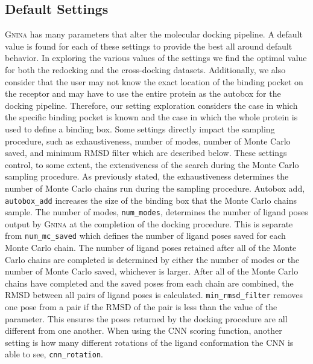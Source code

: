 \documentclass[journal=jcisd8,manuscript=article]{achemso}
\begin{document}
\subsection{Default Settings}
\textsc{Gnina} has many parameters that alter the molecular docking pipeline. A default value is found for each of these settings to provide the best all around default behavior. In exploring the various values of the settings we find the optimal value for both the redocking and the cross-docking datasets. Additionally, we also consider that the user may not know the exact location of the binding pocket on the receptor and may have to use the entire protein as the autobox for the docking pipeline. Therefore, our setting exploration considers the case in which the specific binding pocket is known and the case in which the whole protein is used to define a binding box. Some settings directly impact the sampling procedure, such as exhaustiveness, number of modes, number of Monte Carlo saved, and minimum RMSD filter which are described below. These settings control, to some extent, the extensiveness of the search during the Monte Carlo sampling procedure. As previously stated, the exhaustiveness determines the number of Monte Carlo chains run during the sampling procedure. Autobox add, \texttt{autobox\_add} increases the size of the binding box that the Monte Carlo chains sample. The number of modes, \texttt{num\_modes}, determines the number of ligand poses output by \textsc{Gnina} at the completion of the docking procedure. This is separate from \texttt{num\_mc\_saved} which defines the number of ligand poses saved for each Monte Carlo chain. The number of ligand poses retained after all of the Monte Carlo chains are completed is determined by either the number of modes or the number of Monte Carlo saved, whichever is larger. After all of the Monte Carlo chains have completed and the saved poses from each chain are combined, the RMSD between all pairs of ligand poses is calculated. \texttt{min\_rmsd\_filter} removes one pose from a pair if the RMSD of the pair is less than the value of the parameter. This ensures the poses returned by the docking procedure are all different from one another. When using the CNN scoring function, another setting is how many different rotations of the ligand conformation the CNN is able to see, \texttt{cnn\_rotation}.
\end{document}
